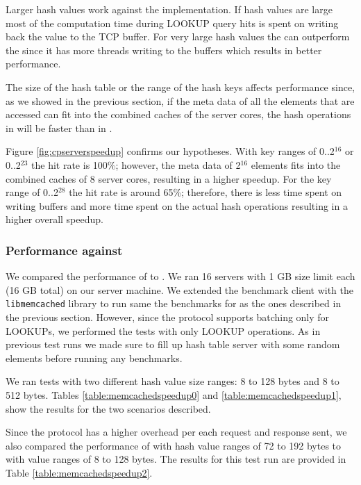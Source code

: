 Larger hash values work against the \cpserver{} implementation. If hash values are large most of the computation time during LOOKUP query hits is spent on 
writing back the value to the TCP buffer. For very large hash values the \lockserver{} can outperform the \cpserver{} since it has more threads 
writing to the buffers which results in better performance.

The size of the hash table or the range of the hash keys affects performance since, as we showed in the previous section, if the meta data of all the elements 
that are accessed can fit into the combined caches of the server cores, the hash operations in \cphash{} will be faster than in \lockhash{}.

Figure \ref{fig:cpserverspeedup} confirms our hypotheses. With key ranges of 0..2$^{16}$ or 0..2$^{23}$ the hit rate is 100\%; however, the meta data of 
2$^{16}$ elements fits into the combined caches of 8 server cores, resulting in a higher speedup. For the key range of 0..2$^{28}$ the hit rate is around 65\%; 
therefore, there is less time spent on writing buffers and more time spent on the actual hash operations resulting in a higher overall speedup.

\subsubsection{Performance against \memcached{}}
We compared the performance of \cpserver{} to \memcached{}. We ran 16 \memcached{} servers with 1 GB size limit each (16 GB total) on our server machine.
We extended the benchmark client with the \texttt{libmemcached} library \cite{libmemcached} to run same the benchmarks for \memcached{} as the ones described in
the previous section. However, since the \memcached{} protocol supports batching only for LOOKUPs, we performed the tests with only LOOKUP operations. As in previous 
test runs we made sure to fill up hash table server with some random elements before running any benchmarks. 

We ran tests with two different hash value size ranges: 8 to 128 bytes and 8 to 512 bytes. 
Tables \ref{table:memcachedspeedup0} and \ref{table:memcachedspeedup1}, show the results for the two scenarios described.

Since the \memcached{} protocol has a higher overhead per each request and response sent, we also compared the performance of \cpserver{} with hash value 
ranges of 72 to 192 bytes to \memcached{} with value ranges of 8 to 128 bytes. The results for this test run are provided in Table \ref{table:memcachedspeedup2}.

